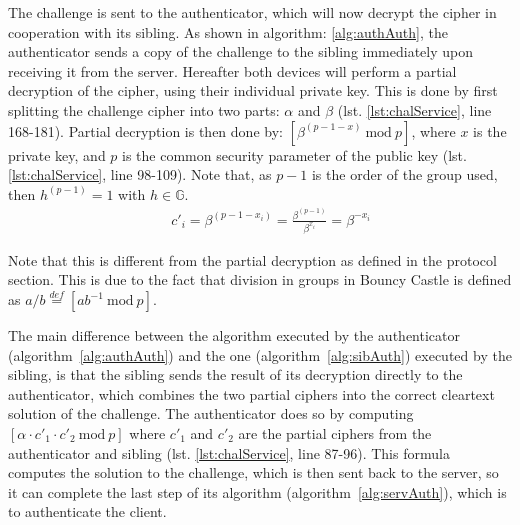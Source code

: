 The challenge is sent to the \gls{authenticator}, which will now decrypt the cipher in cooperation with its \gls{sibling}. As shown in algorithm: \ref{alg:authAuth}, the \gls{authenticator} sends a copy of the challenge to the \gls{sibling} immediately upon receiving it from the server. Hereafter both devices will perform a partial decryption of the cipher, using their individual private key. This is done by first splitting the challenge cipher into two parts: $\alpha$ and $\beta$ (lst. \ref{lst:chalService}, line 168-181). Partial decryption is then done by: $\left[\beta^{(p-1-x)} ~\mathrm{mod}~p\right]$, where $x$ is the private key, and $p$ is the common security parameter of the public key (lst. \ref{lst:chalService}, line 98-109). Note that, as $p-1$ is the order of the group used, then $h^{(p-1)} = 1$ with $h \in \mathbb{G}$.
\begin{align*}
    && c'_i = \beta^{(p-1-x_i)} = \frac{\beta^{(p-1)}}{\beta^{x_i}} = \beta^{-x_i}
\end{align*}

Note that this is different from the partial decryption as defined in the protocol section. This is due to the fact that division in groups in Bouncy Castle is defined as $a / b \stackrel{def}{=} \left[ ab^{-1}~\mathrm{mod}~p \right]$.

The main difference between the algorithm  executed by the \gls{authenticator} (algorithm~\ref{alg:authAuth}) and the one (algorithm~\ref{alg:sibAuth}) executed by the \gls{sibling}, is that the \gls{sibling} sends the result of its decryption directly to the \gls{authenticator}, which combines the two partial ciphers into the correct cleartext solution of the challenge. The \gls{authenticator} does so by computing $\left[\alpha \cdot c'_1 \cdot c'_2 ~\mathrm{mod}~p\right]$ where $c'_1$ and $c'_2$ are the partial ciphers from the \gls{authenticator} and \gls{sibling} (lst. \ref{lst:chalService}, line 87-96). This formula computes the solution to the challenge, which is then sent back to the server, so it can complete the last step of its algorithm (algorithm~\ref{alg:servAuth}), which is to authenticate the \gls{client}.



